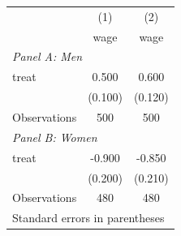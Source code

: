 \begin{tabular}{lcc}
\toprule
 & (1) & (2) \\
 & wage & wage \\
\midrule
\multicolumn{3}{l}{\textit{Panel A: Men}} \\
treat & 0.500 & 0.600 \\
      & (0.100) & (0.120) \\
Observations & 500 & 500 \\
\midrule
\multicolumn{3}{l}{\textit{Panel B: Women}} \\
treat & -0.900 & -0.850 \\
      & (0.200) & (0.210) \\
Observations & 480 & 480 \\
\bottomrule
\multicolumn{3}{l}{\footnotesize Standard errors in parentheses} \\
\end{tabular}
